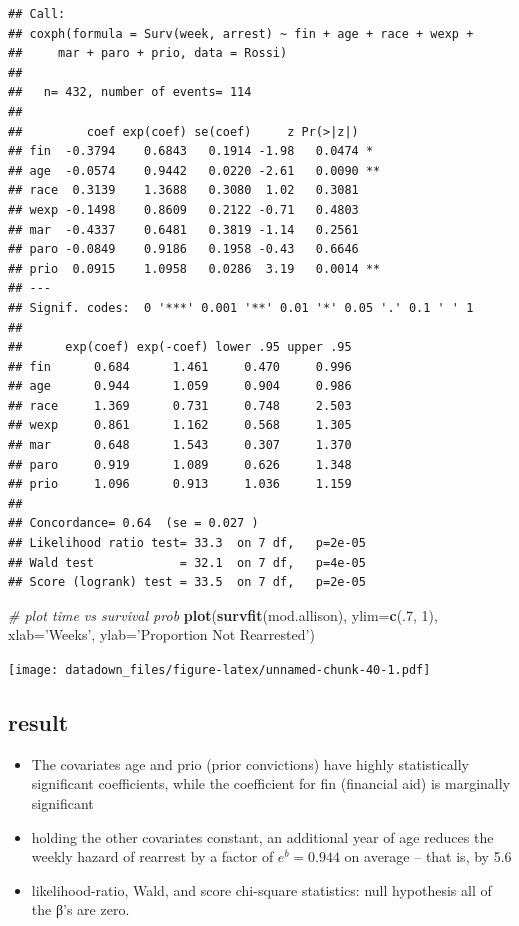 \documentclass[]{book}
\newenvironment{Shaded}{\begin{snugshade}}{\end{snugshade}}
\newcommand{\CommentTok}[1]{\textcolor[rgb]{0.56,0.35,0.01}{\textit{#1}}}
\newcommand{\DataTypeTok}[1]{\textcolor[rgb]{0.13,0.29,0.53}{#1}}
\newcommand{\DecValTok}[1]{\textcolor[rgb]{0.00,0.00,0.81}{#1}}
\newcommand{\KeywordTok}[1]{\textcolor[rgb]{0.13,0.29,0.53}{\textbf{#1}}}
\newcommand{\NormalTok}[1]{#1}
\newcommand{\StringTok}[1]{\textcolor[rgb]{0.31,0.60,0.02}{#1}}
\providecommand{\tightlist}{%
  \setlength{\itemsep}{0pt}\setlength{\parskip}{0pt}}
\begin{document}
\begin{verbatim}
## Call:
## coxph(formula = Surv(week, arrest) ~ fin + age + race + wexp + 
##     mar + paro + prio, data = Rossi)
## 
##   n= 432, number of events= 114 
## 
##         coef exp(coef) se(coef)     z Pr(>|z|)   
## fin  -0.3794    0.6843   0.1914 -1.98   0.0474 * 
## age  -0.0574    0.9442   0.0220 -2.61   0.0090 **
## race  0.3139    1.3688   0.3080  1.02   0.3081   
## wexp -0.1498    0.8609   0.2122 -0.71   0.4803   
## mar  -0.4337    0.6481   0.3819 -1.14   0.2561   
## paro -0.0849    0.9186   0.1958 -0.43   0.6646   
## prio  0.0915    1.0958   0.0286  3.19   0.0014 **
## ---
## Signif. codes:  0 '***' 0.001 '**' 0.01 '*' 0.05 '.' 0.1 ' ' 1
## 
##      exp(coef) exp(-coef) lower .95 upper .95
## fin      0.684      1.461     0.470     0.996
## age      0.944      1.059     0.904     0.986
## race     1.369      0.731     0.748     2.503
## wexp     0.861      1.162     0.568     1.305
## mar      0.648      1.543     0.307     1.370
## paro     0.919      1.089     0.626     1.348
## prio     1.096      0.913     1.036     1.159
## 
## Concordance= 0.64  (se = 0.027 )
## Likelihood ratio test= 33.3  on 7 df,   p=2e-05
## Wald test            = 32.1  on 7 df,   p=4e-05
## Score (logrank) test = 33.5  on 7 df,   p=2e-05
\end{verbatim}

\begin{Shaded}
\begin{Highlighting}[]
\CommentTok{# plot time vs survival prob}
\KeywordTok{plot}\NormalTok{(}\KeywordTok{survfit}\NormalTok{(mod.allison), }\DataTypeTok{ylim=}\KeywordTok{c}\NormalTok{(.}\DecValTok{7}\NormalTok{, }\DecValTok{1}\NormalTok{), }\DataTypeTok{xlab=}\StringTok{'Weeks'}\NormalTok{, }\DataTypeTok{ylab=}\StringTok{'Proportion Not Rearrested'}\NormalTok{)}
\end{Highlighting}
\end{Shaded}

\texttt{[image: datadown\_files/figure-latex/unnamed-chunk-40-1.pdf]}

\hypertarget{result}{%
\subsection{result}\label{result}}

\begin{itemize}
\tightlist
\item
  The covariates age and prio (prior convictions) have highly statistically significant coefficients, while the coefficient for fin (financial aid) is marginally significant
\item
  holding the other covariates constant, an additional year of age reduces the weekly hazard of rearrest by a factor of \(e^b = 0.944\) on average -- that is, by 5.6
\item
  likelihood-ratio, Wald, and score chi-square statistics: null hypothesis all of the β's are zero.
\end{itemize}
\end{document}
